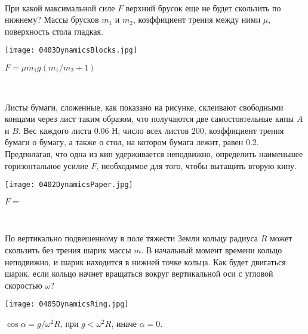 \begin{ex}
\hspace{0pt} \\
\begin{minipage}{.65\textwidth}
При какой максимальной силе $F$ верхний брусок еще не будет скользить по нижнему? Массы брусков $m_1$ и $m_2$, коэффициент трения между ними $\mu$, поверхность стола гладкая.
\end{minipage}
\begin{minipage}{.35\textwidth}
\centering
\texttt{[image: 0403DynamicsBlocks.jpg]}
\end{minipage}
\begin{ans}
$F = \mu m_1 g \left(m_1/m_2 + 1 \right)$
\end{ans}
\end{ex}

\begin{ex}
\hspace{0pt} \\
\begin{minipage}{.65\textwidth}
Листы бумаги, сложенные, как показано на рисунке, склеивают свободными концами через лист таким образом, что получаются две самостоятельные кипы $A$ и $B$. Вес каждого листа 0.06 Н, число всех листов 200, коэффициент трения бумаги о бумагу, а также о стол, на котором бумага лежит, равен 0.2. Предполагая, что одна из кип удерживается неподвижно, определить наименьшее горизонтальное усилие $F$, необходимое для того, чтобы вытащить вторую кипу.
\end{minipage}
\begin{minipage}{.35\textwidth}
\centering
\texttt{[image: 0402DynamicsPaper.jpg]}
\end{minipage}
\begin{ans}
$F = $
\end{ans}
\end{ex}

\begin{ex}
\hspace{0pt} \\
\begin{minipage}{.65\textwidth}
По вертикально подвешенному в поле тяжести Земли кольцу радиуса $R$ может скользить без трения шарик массы $m$. 
В начальный момент времени кольцо неподвижно, и шарик находится в нижней точке кольца. 
Как будет двигаться шарик, если кольцо начнет вращаться вокруг вертикальной оси с угловой скоростью $\omega$?
\end{minipage}
\begin{minipage}{.35\textwidth}
\centering
\texttt{[image: 0405DynamicsRing.jpg]}
\end{minipage}
\begin{ans}
$\cos \alpha = g/\omega^2 R$, при $g < \omega^2 R$, иначе $\alpha = 0$.
\end{ans}
\end{ex}

